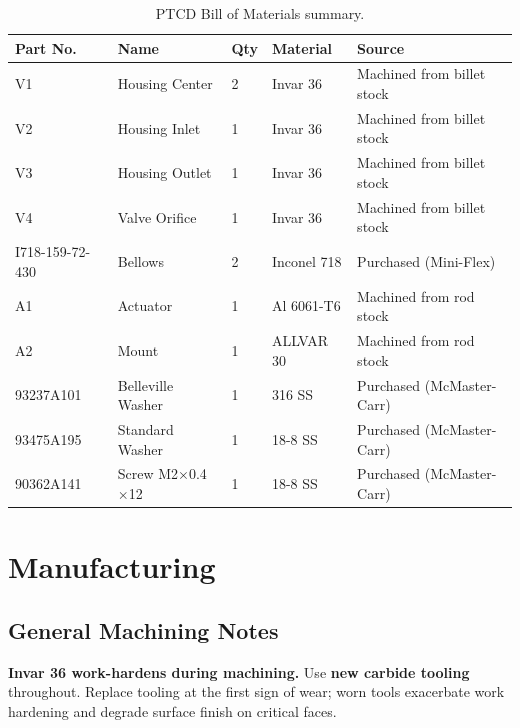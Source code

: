 \documentclass[12pt, letterpaper]{report}%
\newcounter{mycounter}           %
\newcounter{sub}[mycounter]      %
\begin{document}
\begin{table}[H]
	\centering
	\caption{PTCD Bill of Materials summary.}
	\label{tab:mfg_parts}
	\small
	\begin{tabularx}{\textwidth}{llllX}
		\toprule
		\textbf{Part No.} & \textbf{Name} & \textbf{Qty} & \textbf{Material} & \textbf{Source} \\
		\midrule
		V1 & Housing Center   & 2 & Invar 36    & Machined from billet stock \\
		V2 & Housing Inlet    & 1 & Invar 36    & Machined from billet stock \\
		V3 & Housing Outlet   & 1 & Invar 36    & Machined from billet stock \\
		V4 & Valve Orifice    & 1 & Invar 36    & Machined from billet stock \\
		I718-159-72-430 & Bellows & 2 & Inconel 718 & Purchased (Mini-Flex) \\
		A1 & Actuator         & 1 & Al 6061-T6  & Machined from rod stock \\
		A2 & Mount            & 1 & ALLVAR 30   & Machined from rod stock \\
		93237A101 & Belleville Washer & 1 & 316 SS & Purchased (McMaster-Carr) \\
		93475A195 & Standard Washer   & 1 & 18-8 SS & Purchased (McMaster-Carr) \\
		90362A141 & Screw M2$\times$0.4$\times$12 & 1 & 18-8 SS & Purchased (McMaster-Carr) \\
		\bottomrule
	\end{tabularx}
\end{table}

\newpage
\section{Manufacturing}
\label{sec:mfg}

\subsection{General Machining Notes}
\label{sec:mfg:general}

\begin{notebox}
\textbf{Invar 36 work-hardens during machining.} Use \textbf{new carbide tooling}
throughout. Replace tooling at the first sign of wear; worn tools exacerbate work
hardening and degrade surface finish on critical faces.
\end{notebox}
\end{document}
